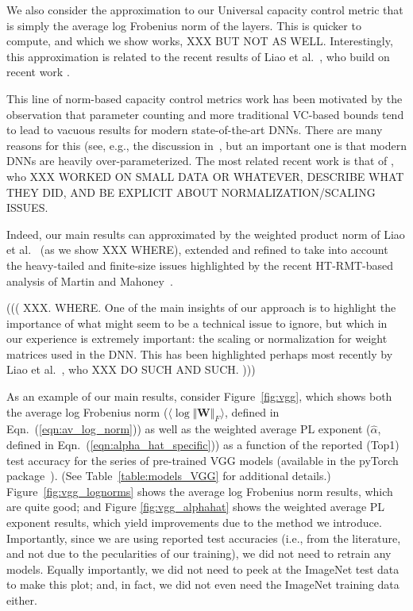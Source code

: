 We also consider the approximation to our Universal capacity control metric that is simply the average log Frobenius norm of the layers.
This is quicker to compute, and which we show works, XXX BUT NOT AS WELL.
Interestingly, this approximation is related to the recent results of Liao et al.~\cite{LMBx18_TR}, who build on recent work \cite{SHNx17_TR,PLMx18_TR}.


This line of norm-based capacity control metrics work has been motivated by the observation that parameter counting and more traditional VC-based bounds tend to lead to vacuous results for modern state-of-the-art DNNs.
There are many reasons for this (see, e.g., the discussion in~\cite{MM17_TR,MM18_TR}, but an important one is that modern DNNs are heavily over-parameterized.
The most related recent work is that of \cite{LMBx18_TR}, who XXX WORKED ON SMALL DATA OR WHATEVER, DESCRIBE WHAT THEY DID, AND BE EXPLICIT ABOUT NORMALIZATION/SCALING ISSUES.

Indeed, our main results can approximated by the weighted product norm of Liao et al.~\cite{LMBx18_TR} (as we show XXX WHERE), extended and refined to take into account the heavy-tailed and finite-size issues highlighted by the recent HT-RMT-based analysis of Martin and Mahoney~\cite{MM18_TR}.


(((
XXX.  WHERE.
One of the main insights of our approach is to highlight the importance of what might seem to be a technical issue to ignore, but which in our experience is extremely important: the scaling or normalization for weight matrices used in the DNN.
This has been highlighted perhaps most recently by Liao et al.~\cite{LMBx18_TR}, who 
XXX DO SUCH AND SUCH.
)))

As an example of our main results, consider Figure~\ref{fig:vgg}, which shows both the average log Frobenius norm 
($\langle\log\Vert\mathbf{W}\Vert_{F}\rangle$, defined in Eqn.~(\ref{eqn:av_log_norm}))
as well as the weighted average PL exponent ($\hat{\alpha}$, defined in Eqn.~(\ref{eqn:alpha_hat_specific}))
as a function of the reported (Top1) test accuracy for the series of pre-trained VGG models (available in the pyTorch package~\cite{pyTorch}).
(See Table~\ref{table:models_VGG} for additional details.)
Figure~\ref{fig:vgg_lognorms} shows the average log Frobenius norm results, which are quite good; and 
Figure \ref{fig:vgg_alphahat} shows the weighted average PL exponent results, which yield improvements due to the method we introduce.
Importantly, since we are using reported test accuracies (i.e., from the literature, and not due to the pecularities of our training), we did not need to retrain any models.
Equally importantly, we did not need to peek at the ImageNet test data to make this plot; and, in fact, we did not even need the ImageNet training data either.  


